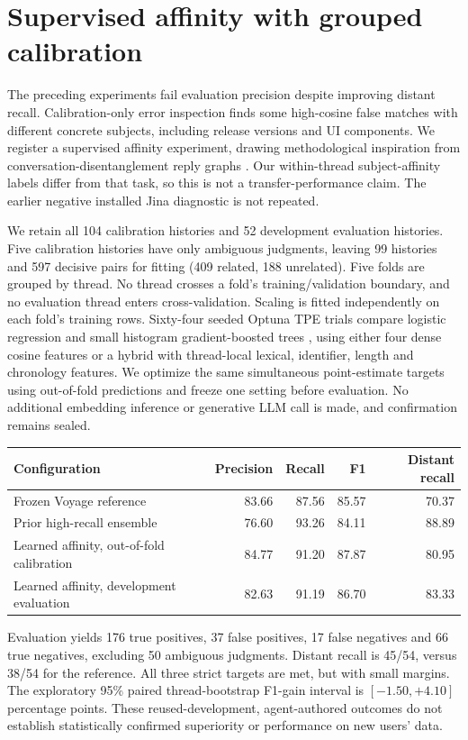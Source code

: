\section{Supervised affinity with grouped calibration}
The preceding experiments fail evaluation precision despite improving distant
recall. Calibration-only error inspection finds some high-cosine false matches
with different concrete subjects, including release versions and UI components.
We register a supervised affinity experiment, drawing methodological inspiration
from conversation-disentanglement reply graphs \cite{kummerfeldAffinity}.
Our within-thread subject-affinity labels differ from that task, so this is not
a transfer-performance claim. The earlier negative installed Jina diagnostic
is not repeated.

We retain all 104 calibration histories and 52 development evaluation histories.
Five calibration histories have only ambiguous judgments, leaving 99 histories
and 597 decisive pairs for fitting (409 related, 188 unrelated). Five folds are
grouped by thread. No thread crosses a fold's training/validation boundary, and
no evaluation thread enters cross-validation. Scaling is fitted independently
on each fold's training rows. Sixty-four seeded Optuna TPE trials compare logistic
regression and small histogram gradient-boosted trees \cite{sklearnAffinity},
using either four dense cosine features or a hybrid with thread-local lexical,
identifier, length and chronology features. We optimize the same simultaneous
point-estimate targets using out-of-fold predictions and freeze one setting
before evaluation. No additional embedding inference or generative LLM call
is made, and confirmation remains sealed.

\begin{center}\small
\begin{tabular}{lrrrr}
\toprule
Configuration & Precision & Recall & F1 & Distant recall\\
\midrule
Frozen Voyage reference &83.66&87.56&85.57&70.37\\
Prior high-recall ensemble &76.60&93.26&84.11&88.89\\
Learned affinity, out-of-fold calibration &84.77&91.20&87.87&80.95\\
Learned affinity, development evaluation &82.63&91.19&86.70&83.33\\
\bottomrule
\end{tabular}
\end{center}
Evaluation yields 176 true positives, 37 false positives, 17 false negatives and
66 true negatives, excluding 50 ambiguous judgments. Distant recall is 45/54,
versus 38/54 for the reference. All three strict targets are met, but with small
margins. The exploratory 95\% paired thread-bootstrap F1-gain interval is
$[-1.50,+4.10]$ percentage points. These reused-development, agent-authored
outcomes do not establish statistically confirmed superiority or performance
on new users' data.


